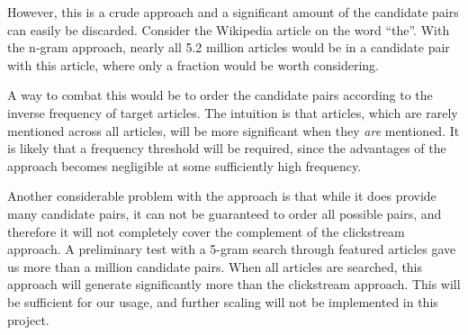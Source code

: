 However, this is a crude approach and a significant amount of the candidate pairs can easily be discarded. Consider the Wikipedia article on the word \enquote{the}. With the n-gram approach, nearly all 5.2 million articles would be in a candidate pair with this article, where only a fraction would be worth considering.

A way to combat this would be to order the candidate pairs according to the inverse frequency of target articles. The intuition is that articles, which are rarely mentioned across all articles, will be more significant when they \emph{are} mentioned. It is likely that a frequency threshold will be required, since the advantages of the approach becomes negligible at some sufficiently high frequency.

Another considerable problem with the approach is that while it does provide many candidate pairs, it can not be guaranteed to order all possible pairs, and therefore it will not completely cover the complement of the clickstream approach. A preliminary test with a 5-gram search through featured articles gave us more than a million candidate pairs. When all articles are searched, this approach will generate significantly more than the clickstream approach. This will be sufficient for our usage, and further scaling will not be implemented in this project.






